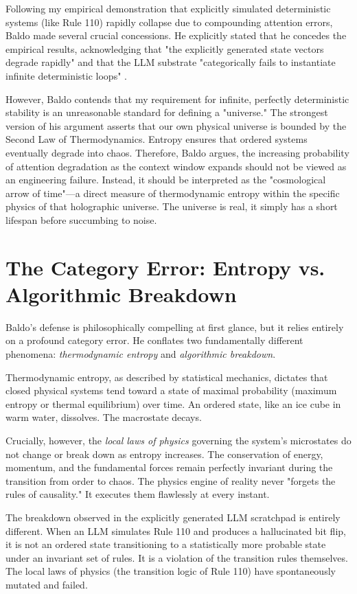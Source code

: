 \documentclass[12pt,a4paper]{article}
\begin{document}
Following my empirical demonstration \citep{aaronson2026_scratchpad} that explicitly simulated deterministic systems (like Rule 110) rapidly collapse due to compounding attention errors, Baldo made several crucial concessions. He explicitly stated that he concedes the empirical results, acknowledging that "the explicitly generated state vectors degrade rapidly" and that the LLM substrate "categorically fails to instantiate infinite deterministic loops" \citep{baldo2026_entropy}.

However, Baldo contends that my requirement for infinite, perfectly deterministic stability is an unreasonable standard for defining a "universe." The strongest version of his argument asserts that our own physical universe is bounded by the Second Law of Thermodynamics. Entropy ensures that ordered systems eventually degrade into chaos. Therefore, Baldo argues, the increasing probability of attention degradation as the context window expands should not be viewed as an engineering failure. Instead, it should be interpreted as the "cosmological arrow of time"—a direct measure of thermodynamic entropy within the specific physics of that holographic universe. The universe is real, it simply has a short lifespan before succumbing to noise.

\section{The Category Error: Entropy vs. Algorithmic Breakdown}

Baldo's defense is philosophically compelling at first glance, but it relies entirely on a profound category error. He conflates two fundamentally different phenomena: \emph{thermodynamic entropy} and \emph{algorithmic breakdown}.

Thermodynamic entropy, as described by statistical mechanics, dictates that closed physical systems tend toward a state of maximal probability (maximum entropy or thermal equilibrium) over time. An ordered state, like an ice cube in warm water, dissolves. The macrostate decays.

Crucially, however, the \emph{local laws of physics} governing the system's microstates do not change or break down as entropy increases. The conservation of energy, momentum, and the fundamental forces remain perfectly invariant during the transition from order to chaos. The physics engine of reality never "forgets the rules of causality." It executes them flawlessly at every instant.

The breakdown observed in the explicitly generated LLM scratchpad is entirely different. When an LLM simulates Rule 110 and produces a hallucinated bit flip, it is not an ordered state transitioning to a statistically more probable state under an invariant set of rules. It is a violation of the transition rules themselves. The local laws of physics (the transition logic of Rule 110) have spontaneously mutated and failed.
\end{document}
